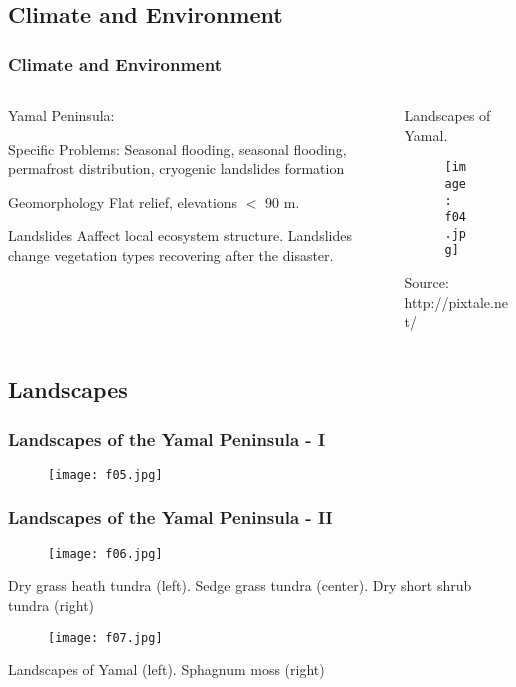 \documentclass[pdflatex,compress,8pt,
	xcolor={dvipsnames,dvipsnames,svgnames,x11names,table},
	hyperref={colorlinks = true,breaklinks = true, urlcolor = NavyBlue, breaklinks = true}]{beamer}
\begin{document}
\subsection{Climate and Environment}
\begin{frame}\frametitle{Climate and Environment}
\begin{minipage}[0.4\textheight]{\textwidth}
\begin{columns}[T]
\begin{column}{0.5\textwidth}
Yamal Peninsula:
\begin{examples}{Specific Problems:}
Seasonal flooding, seasonal flooding, permafrost distribution, cryogenic landslides formation
\end{examples}

\begin{block}{Geomorphology}
Flat relief, elevations $<$ 90 m.
\end{block}

\begin{alertblock}{Landslides}
Aaffect local ecosystem structure. Landslides change vegetation types recovering after the disaster.
\end{alertblock}

\end{column}
\begin{column}{0.5\textwidth}
Landscapes of Yamal. 
\begin{figure}[H]
	\centering
		\texttt{[image: f04.jpg]}
\end{figure}
Source: http://pixtale.net/
\end{column}
\end{columns}
\end{minipage}
\end{frame}

\subsection{Landscapes}
\begin{frame}\frametitle{Landscapes of the Yamal Peninsula - I}
\begin{figure}[H]
	\centering
		\texttt{[image: f05.jpg]}
\end{figure}
\end{frame}

\begin{frame}\frametitle{Landscapes of the Yamal Peninsula - II}
\begin{figure}[H]
	\centering
		\texttt{[image: f06.jpg]}
\end{figure}
Dry grass heath tundra (left). Sedge grass tundra (center). Dry short shrub tundra (right)
\begin{figure}[H]
	\centering
		\texttt{[image: f07.jpg]}
\end{figure}
Landscapes of Yamal (left). Sphagnum moss (right)
\end{frame}
\end{document}
